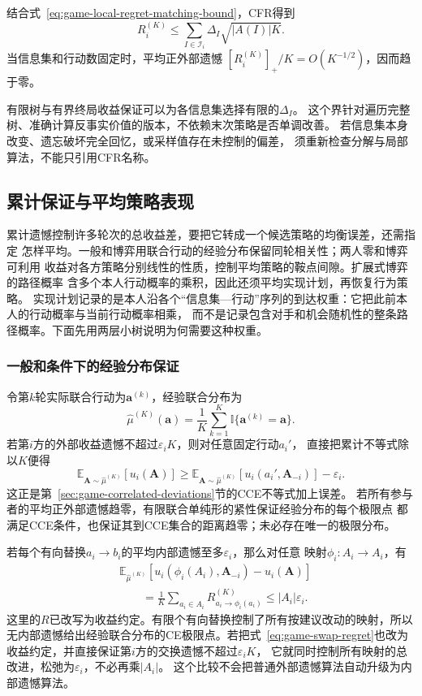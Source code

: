 结合式~\eqref{eq:game-local-regret-matching-bound}，CFR得到
\begin{equation}
  R_i^{(K)}
  \leq
  \sum_{I\in\mathcal{I}_i}
  \Delta_I\sqrt{|A(I)|K}.
  \label{eq:game-cfr-rate}
\end{equation}
当信息集和行动数固定时，平均正外部遗憾
\([R_i^{(K)}]_+/K=O(K^{-1/2})\)，因而趋于零。

有限树与有界终局收益保证可以为各信息集选择有限的\(\Delta_I\)。
这个界针对遍历完整树、准确计算反事实价值的版本，不依赖末次策略是否单调改善。
若信息集本身改变、遗忘破坏完全回忆，或采样值存在未控制的偏差，
须重新检查分解与局部算法，不能只引用CFR名称。

\subsection{累计保证与平均策略表现}
\label{sec:game-regret-average-guarantees}

累计遗憾控制许多轮次的总收益差，要把它转成一个候选策略的均衡误差，还需指定
怎样平均。一般和博弈用联合行动的经验分布保留同轮相关性；两人零和博弈可利用
收益对各方策略分别线性的性质，控制平均策略的鞍点间隙。扩展式博弈的路径概率
含多个本人行动概率的乘积，因此还须平均实现计划，再恢复行为策略。
实现计划记录的是本人沿各个“信息集—行动”序列的到达权重：它把此前本人的行动概率与当前行动概率相乘，
而不是记录包含对手和机会随机性的整条路径概率。下面先用两层小树说明为何需要这种权重。

\subsubsection{一般和条件下的经验分布保证}
\label{sec:game-empirical-equilibrium}

令第\(k\)轮实际联合行动为\(\bm a^{(k)}\)，经验联合分布为
\[
  \widehat\mu^{(K)}(\bm a)
  =\frac1K\sum_{k=1}^K\mathbb I\{\bm a^{(k)}=\bm a\}.
\]
若第\(i\)方的外部收益遗憾不超过\(\varepsilon_iK\)，则对任意固定行动\(a_i'\)，
直接把累计不等式除以\(K\)便得
\[
  \mathbb E_{\bm A\sim\widehat\mu^{(K)}}[u_i(\bm A)]
  \geq
  \mathbb E_{\bm A\sim\widehat\mu^{(K)}}
     [u_i(a_i',\bm A_{-i})]-\varepsilon_i.
\]
这正是第~\ref{sec:game-correlated-deviations}节的CCE不等式加上误差。
若所有参与者的平均正外部遗憾趋零，有限联合单纯形的紧性保证经验分布的每个极限点
都满足CCE条件，也保证其到CCE集合的距离趋零；未必存在唯一的极限分布。

若每个有向替换\(a_i\to b_i\)的平均内部遗憾至多\(\varepsilon_i\)，那么对任意
映射\(\phi_i:A_i\to A_i\)，有
\[
  \begin{aligned}
    &\mathbb E_{\widehat\mu^{(K)}}[
       u_i(\phi_i(A_i),\bm A_{-i})-u_i(\bm A)]\\
    &\qquad=\frac1K\sum_{a_i\in A_i}R_{a_i\to\phi_i(a_i)}^{(K)}
      \leq |A_i|\varepsilon_i.
  \end{aligned}
\]
这里的\(R\)已改写为收益约定。有限个有向替换控制了所有按建议改动的映射，所以
无内部遗憾给出经验联合分布的CE极限点。若把式~\eqref{eq:game-swap-regret}也改为
收益约定，并直接保证第\(i\)方的交换遗憾不超过\(\varepsilon_iK\)，
它就同时控制所有映射的总改进，松弛为\(\varepsilon_i\)，不必再乘\(|A_i|\)。
这个比较不会把普通外部遗憾算法自动升级为内部遗憾算法。

